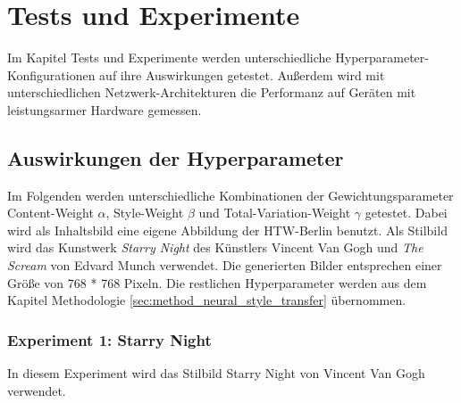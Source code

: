 \chapter{Tests und Experimente}
\label{cha:tests}

Im Kapitel Tests und Experimente werden unterschiedliche Hyperparameter-Konfigurationen auf ihre Auswirkungen getestet. Außerdem wird mit unterschiedlichen
Netzwerk-Architekturen die Performanz auf Geräten mit leistungsarmer Hardware gemessen.

\section{Auswirkungen der Hyperparameter}

Im Folgenden werden unterschiedliche Kombinationen der Gewichtungsparameter Content-Weight $ \alpha $, Style-Weight $ \beta $ und Total-Variation-Weight $ \gamma $ getestet. Dabei wird als Inhaltsbild  eine eigene Abbildung der HTW-Berlin benutzt. Als Stilbild wird das Kunstwerk \textit{Starry Night} des Künstlers Vincent Van Gogh und \textit{The Scream} von Edvard Munch verwendet. Die generierten Bilder entsprechen einer Größe von 768 * 768 Pixeln. Die restlichen Hyperparameter werden aus dem Kapitel Methodologie \ref{sec:method_neural_style_transfer} übernommen.

\pagebreak

\subsection{Experiment 1: Starry Night}

In diesem Experiment wird das Stilbild Starry Night von Vincent Van Gogh verwendet.


